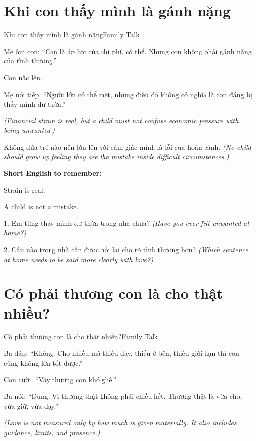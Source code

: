 \section{Khi con thấy mình là gánh nặng}
\begin{truyen}{Khi con thấy mình là gánh nặng}{Family Talk}

Mẹ ôm con: ``Con là áp lực của chi phí, có thể. Nhưng con không phải gánh nặng của tình thương.''

Con nấc lên.

Mẹ nói tiếp: ``Người lớn có thể mệt, nhưng điều đó không có nghĩa là con đáng bị thấy mình dư thừa.''

\textit{(Financial strain is real, but a child must not confuse economic pressure with being unwanted.)}
\end{truyen}

\begin{baihoc}
Không đứa trẻ nào nên lớn lên với cảm giác mình là lỗi của hoàn cảnh.
\textit{(No child should grow up feeling they are the mistake inside difficult circumstances.)}
\end{baihoc}

\begin{ghinhoanh}
\textbf{Short English to remember:}

Strain is real.

A child is not a mistake.
\end{ghinhoanh}

\begin{tuhocnhanh}
1. Em từng thấy mình dư thừa trong nhà chưa? \textit{(Have you ever felt unwanted at home?)}

2. Câu nào trong nhà cần được nói lại cho rõ tình thương hơn? \textit{(Which sentence at home needs to be said more clearly with love?)}
\end{tuhocnhanh}
\ngancach

\section{Có phải thương con là cho thật nhiều?}
\begin{truyen}{Có phải thương con là cho thật nhiều?}{Family Talk}

Ba đáp: ``Không. Cho nhiều mà thiếu dạy, thiếu ở bên, thiếu giới hạn thì con cũng không lớn tốt được.''

Con cười: ``Vậy thương con khó ghê.''

Ba nói: ``Đúng. Vì thương thật không phải chiều hết. Thương thật là vừa cho, vừa giữ, vừa dạy.''

\textit{(Love is not measured only by how much is given materially. It also includes guidance, limits, and presence.)}
\end{truyen}

